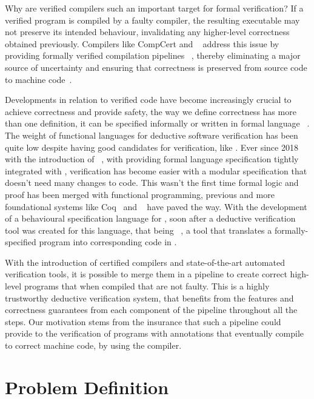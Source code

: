 Why are verified compilers such an important target for formal verification? If a verified program is compiled by a 
faulty compiler, the resulting executable may not preserve its intended behaviour, invalidating any higher-level correctness
obtained previously. Compilers like CompCert and \cml~\cite{POPL14} address this issue by providing formally verified compilation pipelines
~\cite{LoowKTMNAF19, GrossEPPC22, Leroy09}, thereby eliminating a major source of uncertainty and ensuring that correctness is 
preserved from source code to machine code~\cite{LeroyCompilerMeaning}.


Developments in relation to verified code have become increasingly crucial to achieve correctness and provide safety, 
the way we define correctness has more than one definition, it can be specified informally or written in formal language 
~\cite{Filliatre11}. The weight of functional languages for deductive software verification has been quite low despite having
good candidates for verification, like \ocaml. Ever since 2018 with the introduction of \gospel~\cite{ChargueraudFLP19}, with providing
formal language specification tightly integrated with \ocaml, verification has become easier with a modular specification
that doesn't need many changes to \ocaml code. This wasn't the first time formal logic and proof has been merged with 
functional programming, previous and more foundational systems like Coq~\cite{75277.75285} and \whyml~\cite{FilliatreP13} have
paved the way. With the development of a behavioural specification language for \ocaml, soon after a deductive verification tool
was created for this language, that being \cameleer~\cite{PereiraR20}, a tool that translates a formally-specified program into 
corresponding code in \whyml.

With the introduction of certified compilers and state-of-the-art automated verification tools, it is possible to merge them in
a pipeline to create correct high-level programs that when compiled that are not faulty.
This is a highly trustworthy deductive verification system, that benefits from the features and correctness guarantees from each 
component of the pipeline throughout all the steps. Our motivation stems from the insurance that such a pipeline could provide 
to the verification of \ocaml programs with \gospel annotations that eventually compile to correct machine code, by using the \cml
compiler.


\section{Problem Definition}
\label{sec:Problem_Definition}


